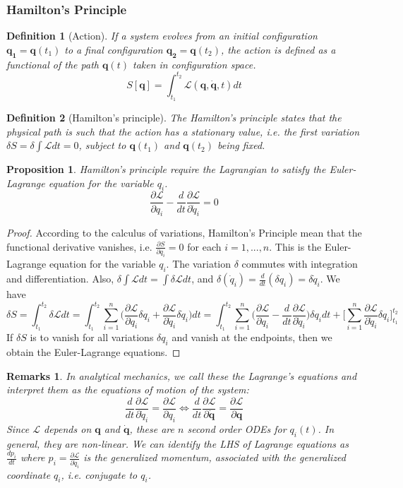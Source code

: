 \documentclass[a4paper]{article}
\newtheorem{remarks}{Remarks}[section]
\theoremstyle{new}
\newtheorem{defi}{Definition}[section]
\newtheorem{prop}{Proposition}[section]
\begin{document}
\subsubsection{Hamilton's Principle}
\begin{defi}[Action]
If a system evolves from an initial configuration $\mathbf{q_1}=\mathbf{q}(t_1)$ to a final configuration $\mathbf{q_2}=\mathbf{q}(t_2)$, the action is defined as a functional of the path $\mathbf{q}(t)$ taken in configuration space.
$$S[\mathbf{q}]=\int_{t_1}^{t_2}\mathcal{L}(\mathbf{q},\mathbf{\dot{q}},t)dt$$
\end{defi}
\begin{defi}[Hamilton's principle]
The Hamilton's principle states that the physical path is such that the action has a stationary value, i.e. the first variation $\delta S=\delta\int\mathcal{L}dt=0$, subject to $\mathbf{q}(t_1)$ and $\mathbf{q}(t_2)$ being fixed. 
\end{defi}
\begin{prop}
Hamilton's principle require the Lagrangian to satisfy the Euler-Lagrange equation for the variable $q_i$.
$$\frac{\partial\mathcal{L}}{\partial q_i}-\frac{d}{dt}\frac{\partial\mathcal{L}}{\partial\dot{q}_i}=0$$
\end{prop}
\begin{proof}
According to the calculus of variations, Hamilton's Principle mean that the functional derivative vanishes, i.e. $\frac{\partial S}{\partial q_i}=0$ for each $i=1,...,n$. This is the Euler-Lagrange equation for the variable $q_i$. The variation $\delta$ commutes with integration and differentiation. Also, $\delta\int\mathcal{L}dt=\int\delta\mathcal{L}dt$, and $\delta(\dot{q}_i)=\frac{d}{dt}(\delta q_i)=\delta\dot{q}_i$. We have
$$\delta S=\int_{t_1}^{t_2}\delta\mathcal{L}dt=\int_{t_1}^{t_2}\sum_{i=1}^n\bigg(\frac{\partial\mathcal{L}}{\partial q_i}\delta q_i+\frac{\partial\mathcal{L}}{\partial\dot{q}_i}\delta\dot{q}_i\bigg)dt=\int_{t_1}^{t_2}\sum_{i=1}^n\bigg(\frac{\partial\mathcal{L}}{\partial q_i}-\frac{d}{dt}\frac{\partial\mathcal{L}}{\partial \dot{q}_i}\bigg)\delta q_idt+\bigg[\sum_{i=1}^n\frac{\partial\mathcal{L}}{\partial\dot{q}_i}\delta q_i\bigg]_{t_1}^{t_2}$$
If $\delta S$ is to vanish for all variations $\delta q_i$ and vanish at the endpoints, then we obtain the Euler-Lagrange equations.
\end{proof}
\begin{remarks}
In analytical mechanics, we call these the Lagrange's equations and interpret them as the equations of motion of the system:
$$\frac{d}{dt}\frac{\partial\mathcal{L}}{\partial\dot{q}_i}=\frac{\partial\mathcal{L}}{\partial q_i}\iff\frac{d}{dt}\frac{\partial\mathcal{L}}{\partial\mathbf{\dot{q}}}=\frac{\partial\mathcal{L}}{\partial\mathbf{q}}$$
Since $\mathcal{L}$ depends on $\mathbf{q}$ and $\mathbf{\dot{q}}$, these are $n$ second order ODEs for $q_i(t)$. In general, they are non-linear. We can identify the LHS of Lagrange equations as $\frac{dp_i}{dt}$ where $p_i=\frac{\partial\mathcal{L}}{\partial\dot{q}_i}$ is the generalized momentum, associated with the generalized coordinate $q_i$, i.e. conjugate to $q_i$.
\end{remarks}
\end{document}
